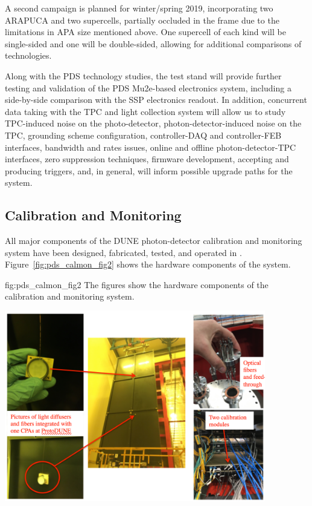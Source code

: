 A second campaign is planned for winter/spring 2019, incorporating two ARAPUCA and two  supercells, partially occluded in the frame due to the limitations in APA size mentioned above.  One supercell of each kind will be single-sided and one will be double-sided, allowing for additional comparisons of  technologies.

Along with the PDS technology studies, the test stand will  provide further testing and validation of the PDS Mu2e-based electronics system, including a side-by-side comparison with the  SSP electronics readout. In addition, concurrent data taking with the TPC and light collection system will allow us to study TPC-induced noise on the photo-detector, photon-detector-induced noise on the TPC, grounding scheme configuration, controller-DAQ and controller-FEB interfaces, bandwidth and rates issues, online and offline photon-detector-TPC interfaces, zero suppression techniques, firmware development, accepting and producing triggers, and, in general, will inform possible upgrade paths for the system. 


\subsection{Calibration and Monitoring}
\label{sec:fdsp-pd-validation-candm}


All major components of the DUNE photon-detector calibration and monitoring system have been designed, fabricated, tested, and operated in .
Figure~\ref{fig:pds_calmon_fig2} shows the hardware components of the system.

 \begin{dunefigure}
 {fig:pds_calmon_fig2}
 {The figures show the hardware components of the  calibration and monitoring system.}
 \includegraphics[angle=0,width=11.4cm,height=9cm]{graphics/pds-calmon-fig2.png}
\end{dunefigure}

